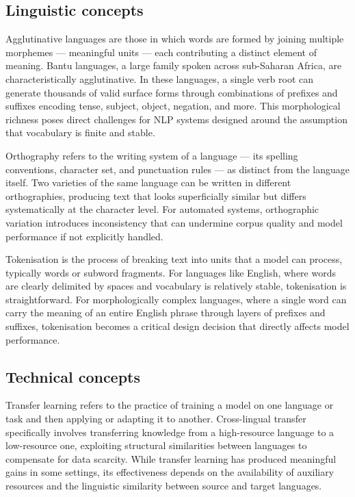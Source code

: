\documentclass[11pt,a4paper]{article}
\begin{document}
\subsection{Linguistic concepts}
Agglutinative languages are those in which words are formed by joining multiple morphemes — meaningful units — each contributing a distinct element of meaning. Bantu languages, a large family spoken across sub-Saharan Africa, are characteristically agglutinative. In these languages, a single verb root can generate thousands of valid surface forms through combinations of prefixes and suffixes encoding tense, subject, object, negation, and more. This morphological richness poses direct challenges for NLP systems designed around the assumption that vocabulary is finite and stable.

Orthography refers to the writing system of a language — its spelling conventions, character set, and punctuation rules — as distinct from the language itself. Two varieties of the same language can be written in different orthographies, producing text that looks superficially similar but differs systematically at the character level. For automated systems, orthographic variation introduces inconsistency that can undermine corpus quality and model performance if not explicitly handled.

Tokenisation is the process of breaking text into units that a model can process, typically words or subword fragments. For languages like English, where words are clearly delimited by spaces and vocabulary is relatively stable, tokenisation is straightforward. For morphologically complex languages, where a single word can carry the meaning of an entire English phrase through layers of prefixes and suffixes, tokenisation becomes a critical design decision that directly affects model performance.
\subsection{Technical concepts}
Transfer learning refers to the practice of training a model on one language or task and then applying or adapting it to another. Cross-lingual transfer specifically involves transferring knowledge from a high-resource language to a low-resource one, exploiting structural similarities between languages to compensate for data scarcity. While transfer learning has produced meaningful gains in some settings, its effectiveness depends on the availability of auxiliary resources and the linguistic similarity between source and target languages.
\end{document}
